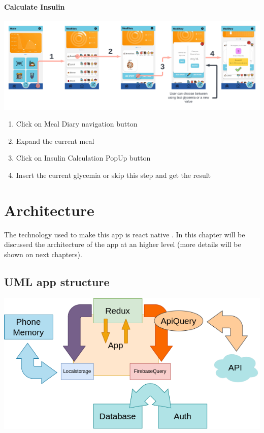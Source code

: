 \documentclass[12pt,hidelinks]{article}
\begin{document}
\paragraph{Calculate Insulin}
\begin{center}
	\includegraphics[scale=0.116]{Insulin Calculation}
\end{center}
\begin{enumerate}
	\item Click on Meal Diary navigation button
    \item Expand the current meal 
	\item Click on Insulin Calculation PopUp button
 	\item Insert the current glycemia or skip this step and get the result
  \end{enumerate}

\newpage
\section{Architecture}
\vspace{10.5cm}
	The technology used to make this app is react native \cite{React Native}.
	In this chapter will be discussed the architecture of the app at an higher level (more details will be shown on next chapters).
\subsection{UML app structure}	
\begin{center}
	\includegraphics[scale=0.4]{Architecture}
\end{center}
\end{document}
